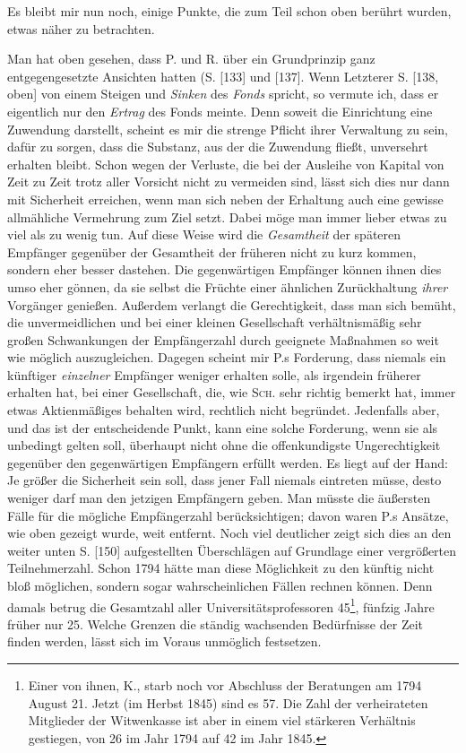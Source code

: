 \par{}
Es bleibt mir nun noch, einige Punkte, die zum Teil schon oben berührt wurden, etwas näher zu betrachten.

Man hat oben gesehen, dass P. und R. über ein Grundprinzip ganz entgegengesetzte Ansichten hatten (S. [133] und [137]. Wenn Letzterer S. [138, oben] von einem Steigen und \textit{Sinken} des \textit{Fonds} spricht, so vermute ich, dass er eigentlich nur den \textit{Ertrag} des Fonds meinte. Denn soweit die Einrichtung eine Zuwendung darstellt, scheint es mir die strenge Pflicht ihrer Verwaltung zu sein, dafür zu sorgen, dass die Substanz, aus der die Zuwendung fließt, unversehrt erhalten bleibt. Schon wegen der Verluste, die bei der Ausleihe von Kapital von Zeit zu Zeit trotz aller Vorsicht nicht zu vermeiden sind, lässt sich dies nur dann mit Sicherheit erreichen, wenn man sich neben der Erhaltung auch eine gewisse allmähliche Vermehrung zum Ziel setzt. Dabei möge man immer lieber etwas zu viel als zu wenig tun. Auf diese Weise wird die \textit{Gesamtheit} der späteren Empfänger gegenüber der Gesamtheit der früheren nicht zu kurz kommen, sondern eher besser dastehen. Die gegenwärtigen Empfänger können ihnen dies umso eher gönnen, da sie selbst die Früchte einer ähnlichen Zurückhaltung \textit{ihrer} Vorgänger genießen. Außerdem verlangt die Gerechtigkeit, dass man sich bemüht, die unvermeidlichen und bei einer kleinen Gesellschaft verhältnismäßig sehr großen Schwankungen der Empfängerzahl durch geeignete Maßnahmen so weit wie möglich auszugleichen. Dagegen scheint mir P.s Forderung, dass niemals ein künftiger \textit{einzelner} Empfänger weniger erhalten solle, als irgendein früherer erhalten hat, bei einer Gesellschaft, die, wie \textsc{Sch.} sehr richtig bemerkt hat, immer etwas Aktienmäßiges behalten wird, rechtlich nicht begründet. Jedenfalls aber, und das ist der entscheidende Punkt, kann eine solche Forderung, wenn sie als unbedingt gelten soll, überhaupt nicht ohne die offenkundigste Ungerechtigkeit gegenüber den gegenwärtigen Empfängern erfüllt werden. Es liegt auf der Hand: Je größer die Sicherheit sein soll, dass jener Fall niemals eintreten müsse, desto weniger darf man den jetzigen Empfängern geben. Man müsste die äußersten Fälle für die mögliche Empfängerzahl berücksichtigen; davon waren P.s Ansätze, wie oben gezeigt wurde, weit entfernt. Noch viel deutlicher zeigt sich dies an den weiter unten S. [150] aufgestellten Überschlägen auf Grundlage einer vergrößerten Teilnehmerzahl. Schon 1794 hätte man diese Möglichkeit zu den künftig nicht bloß möglichen, sondern sogar wahrscheinlichen Fällen rechnen können. Denn damals betrug die Gesamtzahl aller Universitätsprofessoren 45\footnote{Einer von ihnen, K., starb noch vor Abschluss der Beratungen am 1794 August 21. Jetzt (im Herbst 1845) sind es 57. Die Zahl der verheirateten Mitglieder der Witwenkasse ist aber in einem viel stärkeren Verhältnis gestiegen, von 26 im Jahr 1794 auf 42 im Jahr 1845.}, fünfzig Jahre früher nur 25. Welche Grenzen die ständig wachsenden Bedürfnisse der Zeit finden werden, lässt sich im Voraus unmöglich festsetzen.

